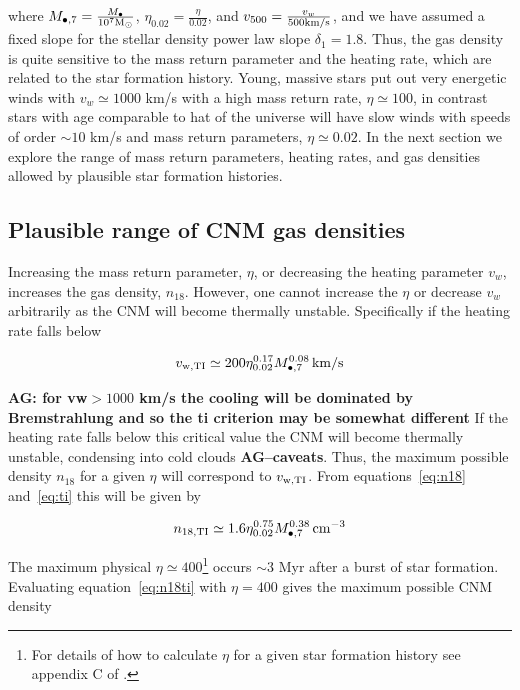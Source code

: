 \documentclass[usenatbib,fleqn]{mnras}
\newcommand{\Mbh}[1][]{M_{\bullet#1}}
\newcommand{\Msun}{{\rm M_\odot}}
\begin{document}
where $\Mbh[,7]=\frac{\Mbh}{10^7 \Msun}$,
$\eta_{0.02}=\frac{\eta}{0.02}$, and $v_{500}=\frac{v_w}{500 {\rm
    km/s}}$, and we have assumed a fixed slope for the stellar density
power law slope $\delta_1=1.8$. Thus, the gas density is quite
sensitive to the mass return parameter and the heating rate, which are
related to the star formation history. Young, massive stars put out
very energetic winds with $v_w\simeq 1000$ km/s with a high mass
return rate, $\eta\simeq 100$, in contrast stars with age comparable
to hat of the universe will have slow winds with speeds of order $\sim
10$ km/s and mass return parameters, $\eta\simeq0.02$. In the next
section we explore the range of mass return parameters, heating rates,
and gas densities allowed by plausible star formation histories.

\subsection{Plausible range of CNM gas densities}
Increasing the mass return parameter, $\eta$, or decreasing the
heating parameter $v_w$, increases the gas density, $n_{18}$.
However, one cannot increase the $\eta$ or decrease $v_w$ arbitrarily
as the CNM will become thermally unstable. Specifically if the heating
rate falls below

\begin{equation}
v_{\rm w,TI}\simeq 200 \eta_{0.02}^{0.17} \Mbh[,7]^{0.08} \,{\rm km/s} 
\label{eq:ti}
\end{equation}

{\bf AG: for vw$>1000$ km/s the cooling will be dominated by
  Bremstrahlung and so the ti criterion may be somewhat different} If
the heating rate falls below this critical value the CNM will become
thermally unstable, condensing into cold clouds {\bf
  AG--caveats}. Thus, the maximum possible density $n_{18}$ for a
given $\eta$ will correspond to $v_{\rm w,TI}$. From
equations~\eqref{eq:n18} and~\eqref{eq:ti} this will be given by

\begin{equation}
n_{\rm 18,TI}\simeq 1.6 \eta_{0.02}^{0.75} \Mbh[,7]^{0.38} \, {\rm cm^{-3}}
\label{eq:n18ti}
\end{equation}

The maximum physical $\eta\simeq 400$\footnote{For details
  of how to calculate $\eta$ for a given star formation history see
  appendix C of \citet{Generozov+2015}.} occurs $\sim 3$ Myr after a
burst of star formation. Evaluating equation~\eqref{eq:n18ti} with
$\eta=400$ gives the maximum possible CNM density
\end{document}
